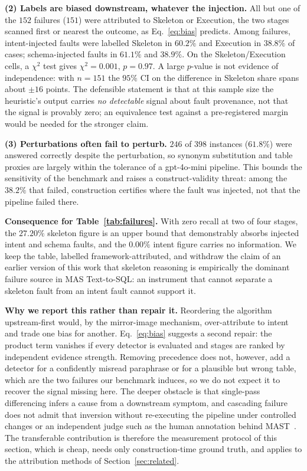 \documentclass{llncs}
\begin{document}
\noindent\textbf{(2) Labels are biased downstream, whatever the injection.}
All but one of the $152$ failures ($151$) were attributed to Skeleton or
Execution, the two stages scanned first or nearest the outcome, as
Eq.~\eqref{eq:bias} predicts. Among
failures, intent-injected faults were labelled Skeleton in $60.2\%$ and
Execution in $38.8\%$ of cases; schema-injected faults in $61.1\%$ and
$38.9\%$. On the Skeleton/Execution cells, a $\chi^2$ test gives
$\chi^2=0.001$, $p=0.97$. A large $p$-value is not evidence of independence:
with $n=151$ the $95\%$ CI on the difference in Skeleton share spans about
$\pm16$ points. The defensible statement is that at this sample size the
heuristic's output carries \emph{no detectable} signal about fault provenance,
not that the signal is provably zero; an equivalence test against a
pre-registered margin would be needed for the stronger claim.

\noindent\textbf{(3) Perturbations often fail to perturb.} $246$ of $398$
instances ($61.8\%$) were answered correctly despite the perturbation, so
synonym substitution and table proxies are largely within the tolerance of a
gpt-4o-mini pipeline. This bounds the sensitivity of the benchmark and raises
a construct-validity threat: among the $38.2\%$ that failed, construction
certifies where the fault was injected, not that the pipeline failed there.

\noindent\textbf{Consequence for Table~\ref{tab:failures}.} With zero recall at
two of four stages, the $27.20\%$ skeleton figure is an upper bound that
demonstrably absorbs injected intent and schema faults, and the $0.00\%$
intent figure carries no information. We keep the table, labelled
framework-attributed, and withdraw the claim of an earlier version of this
work that skeleton reasoning is empirically the dominant failure source in MAS
Text-to-SQL: an instrument that cannot separate a skeleton fault from an
intent fault cannot support it.

\noindent\textbf{Why we report this rather than repair it.} Reordering the
algorithm upstream-first would, by the mirror-image mechanism, over-attribute
to intent and trade one bias for another. Eq.~\eqref{eq:bias} suggests a second
repair: the product term vanishes if every detector is evaluated and stages
are ranked by independent evidence strength. Removing precedence does not,
however, add a detector for a confidently misread paraphrase or for a
plausible but wrong table, which are the two failures our benchmark induces,
so we do not expect it to recover the signal missing here. The deeper
obstacle is that single-pass differencing infers a cause from a downstream
symptom, and cascading failure does not admit that inversion without
re-executing the pipeline under controlled changes or an independent judge
such as the human annotation behind MAST~\cite{cemri_mast_2025}. The
transferable contribution is therefore the measurement protocol of this
section, which is cheap, needs only construction-time ground truth, and
applies to the attribution methods of Section~\ref{sec:related}.
\end{document}

